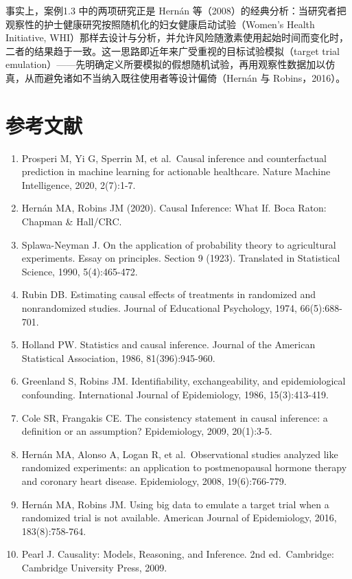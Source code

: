 \documentclass[
  chinese-hans,
  letterpaper,
  DIV=11,
  numbers=noendperiod]{scrreprt}
\begin{document}
事实上，案例1.3 中的两项研究正是 Hernán
等（2008）的经典分析：当研究者把观察性的护士健康研究按照随机化的妇女健康启动试验（Women's
Health Initiative,
WHI）那样去设计与分析，并允许风险随激素使用起始时间而变化时，二者的结果趋于一致。这一思路即近年来广受重视的目标试验模拟（target
trial
emulation）------先明确定义所要模拟的假想随机试验，再用观察性数据加以仿真，从而避免诸如不当纳入既往使用者等设计偏倚（Hernán
与 Robins，2016）。

\section{参考文献}\label{ux53c2ux8003ux6587ux732e}

\begin{enumerate}
\def\labelenumi{\arabic{enumi}.}
\item
  Prosperi M, Yi G, Sperrin M, et al.~Causal inference and
  counterfactual prediction in machine learning for actionable
  healthcare. Nature Machine Intelligence, 2020, 2(7):1-7.
\item
  Hernán MA, Robins JM (2020). Causal Inference: What If. Boca Raton:
  Chapman \& Hall/CRC.
\item
  Splawa-Neyman J. On the application of probability theory to
  agricultural experiments. Essay on principles. Section 9 (1923).
  Translated in Statistical Science, 1990, 5(4):465-472.
\item
  Rubin DB. Estimating causal effects of treatments in randomized and
  nonrandomized studies. Journal of Educational Psychology, 1974,
  66(5):688-701.
\item
  Holland PW. Statistics and causal inference. Journal of the American
  Statistical Association, 1986, 81(396):945-960.
\item
  Greenland S, Robins JM. Identifiability, exchangeability, and
  epidemiological confounding. International Journal of Epidemiology,
  1986, 15(3):413-419.
\item
  Cole SR, Frangakis CE. The consistency statement in causal inference:
  a definition or an assumption? Epidemiology, 2009, 20(1):3-5.
\item
  Hernán MA, Alonso A, Logan R, et al.~Observational studies analyzed
  like randomized experiments: an application to postmenopausal hormone
  therapy and coronary heart disease. Epidemiology, 2008, 19(6):766-779.
\item
  Hernán MA, Robins JM. Using big data to emulate a target trial when a
  randomized trial is not available. American Journal of Epidemiology,
  2016, 183(8):758-764.
\item
  Pearl J. Causality: Models, Reasoning, and Inference. 2nd
  ed.~Cambridge: Cambridge University Press, 2009.
\end{enumerate}
\end{document}
